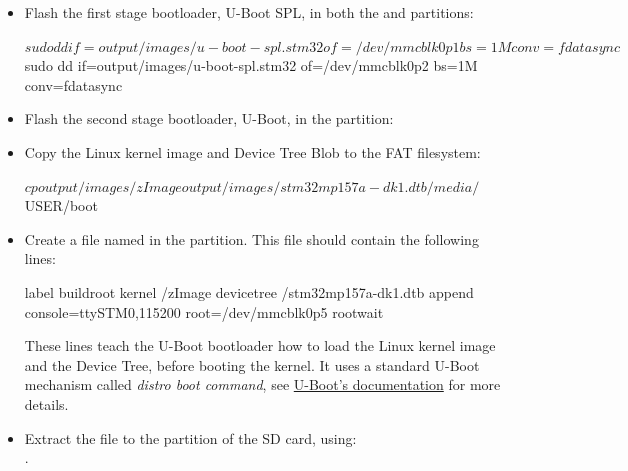 \begin{itemize}

\item Flash the first stage bootloader, U-Boot SPL, in both the
   and  partitions:

\begin{bashinput}
$ sudo dd if=output/images/u-boot-spl.stm32 of=/dev/mmcblk0p1 bs=1M conv=fdatasync
$ sudo dd if=output/images/u-boot-spl.stm32 of=/dev/mmcblk0p2 bs=1M conv=fdatasync
\end{bashinput}

\item Flash the second stage bootloader, U-Boot, in the 
  partition:


\item Copy the Linux kernel image and Device Tree Blob to the FAT filesystem:

\begin{bashinput}
$ cp output/images/zImage output/images/stm32mp157a-dk1.dtb /media/$USER/boot
\end{bashinput}

\item Create a file named  in the
   partition. This file should contain the following lines:

{\small
\begin{fileinput}
label buildroot
  kernel /zImage
  devicetree /stm32mp157a-dk1.dtb
  append console=ttySTM0,115200 root=/dev/mmcblk0p5 rootwait
\end{fileinput}
}

These lines teach the U-Boot bootloader how to load the Linux kernel
image and the Device Tree, before booting the kernel. It uses a
standard U-Boot mechanism called {\em distro boot command}, see
\href{https://docs.u-boot.org/en/stable/develop/distro.html}{U-Boot's documentation}
for more details.

\item Extract the  file to the 
  partition of the SD card, using:\\
  .

\end{itemize}

